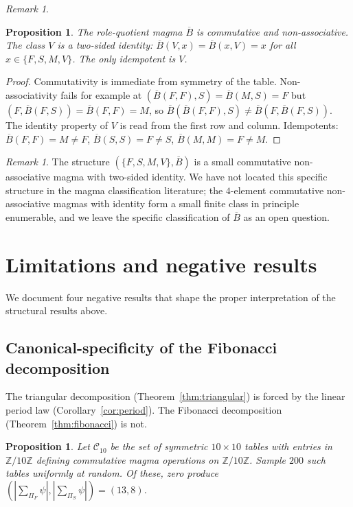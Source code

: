 \documentclass[submission,copyright,creativecommons]{eptcs}
\theoremstyle{plain}
\newtheorem{proposition}[theorem]{Proposition}
\theoremstyle{definition}
\theoremstyle{remark}
\newtheorem{remark}[theorem]{Remark}
\begin{document}
\begin{remark}
\begin{proposition}\label{prop:role-magma}
The role-quotient magma $\overline{B}$ is commutative and non-associative.
The class $V$ is a two-sided identity: $\overline{B}(V, x) = \overline{B}(x, V) = x$
for all $x \in \{F, S, M, V\}$. The only idempotent is $V$.
\end{proposition}

\begin{proof}
Commutativity is immediate from symmetry of the table. Non-associativity
fails for example at $(\overline{B}(F, F), S) = \overline{B}(M, S) = F$ but
$(F, \overline{B}(F, S)) = \overline{B}(F, F) = M$, so $\overline{B}(\overline{B}(F, F), S) \neq
\overline{B}(F, \overline{B}(F, S))$. The identity property of $V$ is read from
the first row and column. Idempotents: $\overline{B}(F, F) = M \neq F$,
$\overline{B}(S, S) = F \neq S$, $\overline{B}(M, M) = F \neq M$.
\end{proof}

\begin{remark}
The structure $(\{F, S, M, V\}, \overline{B})$ is a small commutative
non-associative magma with two-sided identity. We have not located this
specific structure in the magma classification literature; the
$4$-element commutative non-associative magmas with identity form a small
finite class in principle enumerable, and we leave the specific
classification of $\overline{B}$ as an open question.
\end{remark}

\section{Limitations and negative results}\label{sec:limitations}

We document four negative results that shape the proper interpretation of
the structural results above.

\subsection{Canonical-specificity of the Fibonacci decomposition}

The triangular decomposition (Theorem~\ref{thm:triangular}) is forced by
the linear period law (Corollary~\ref{cor:period}). The Fibonacci
decomposition (Theorem~\ref{thm:fibonacci}) is not.

\begin{proposition}\label{prop:fibonacci-fragility}
Let $\mathcal{C}_{10}$ be the set of symmetric $10 \times 10$ tables with
entries in $\mathbb{Z}/10\mathbb{Z}$ defining commutative magma operations
on $\mathbb{Z}/10\mathbb{Z}$. Sample $200$ such tables uniformly at random.
Of these, zero produce $(|\sum_{\Pi_F} \psi|, |\sum_{\Pi_S} \psi|) = (13, 8)$.
\end{proposition}


\end{remark}
\end{document}
